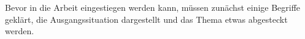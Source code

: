 Bevor in die Arbeit eingestiegen werden kann, müssen zunächst einige Begriffe geklärt, die Ausgangssituation dargestellt und das Thema etwas abgesteckt werden.







%

